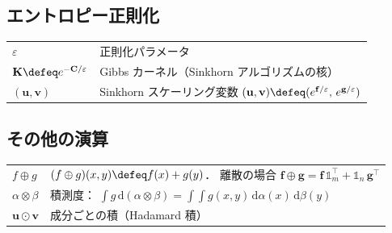 \subsection*{エントロピー正則化}

\begin{tabular}{lp{28em}}
  $\varepsilon$ & 正則化パラメータ \\[3pt]
  $\mathbf{K} \defeq e^{-\mathbf{C}/\varepsilon}$ &
    Gibbs カーネル（Sinkhorn アルゴリズムの核） \\[3pt]
  $(\mathbf{u}, \mathbf{v})$ &
    Sinkhorn スケーリング変数
    $(\mathbf{u}, \mathbf{v}) \defeq (e^{\mathbf{f}/\varepsilon},\, e^{\mathbf{g}/\varepsilon})$
\end{tabular}

\subsection*{その他の演算}

\begin{tabular}{lp{28em}}
  $f \oplus g$ & $(f \oplus g)(x,y) \defeq f(x) + g(y)$．
    離散の場合 $\mathbf{f} \oplus \mathbf{g}
    = \mathbf{f}\, \mathbb{1}_m^\top + \mathbb{1}_n\, \mathbf{g}^\top$ \\[3pt]
  $\alpha \otimes \beta$ & 積測度：
    $\int g\, \mathrm{d}(\alpha \otimes \beta)
    = \int\!\!\int g(x,y)\, \mathrm{d}\alpha(x)\, \mathrm{d}\beta(y)$ \\[3pt]
  $\mathbf{u} \odot \mathbf{v}$ & 成分ごとの積（Hadamard 積）
\end{tabular}
